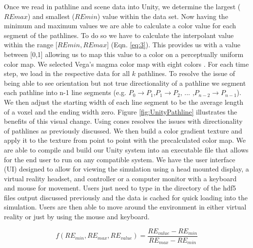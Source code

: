 Once we read in pathline and scene data into Unity, we determine the largest (\ensuremath{REmax}) and smallest (\ensuremath{REmin}) value within the data set. Now having the minimum and maximum values we are able to calculate a color value for each segment of the pathlines. To do so we have to calculate the interpolant value within the range [\ensuremath{REmin, REmax}] (Eqn. \ref{eq:3}). This provides us with a value between [0,1] allowing us to  map this value to a color on a perceptually uniform color map. We selected Vega’s magma color map with eight colors \cite{colorschemes}. For each time step, we load in the respective data for all \ensuremath{k} pathlines. To resolve the issue of being able to see orientation but not true directionality of a pathline we segment each pathline into n-1 line segments (e.g. \ensuremath{P_0\rightarrow P_1},\ensuremath{P_1 \rightarrow P_2}, ... ,\ensuremath{P_{n-2} \rightarrow P_{n-1}}).
We then adjust the starting width of each line segment to be the average length of a voxel and the ending width zero. Figure \ref{fig:UnityPathline} illustrates the benefits of this visual change. Using cones resolves the issues with directionality of pathlines as previously discussed. We then build a color gradient texture and apply it to the texture from point to point with the precalculated color map. We are able to compile and build our Unity system into an executable file that allows for the end user to run on any compatible system. We have the user interface (UI) designed to allow for viewing the simulation using a head mounted display, a virtual reality headset, and controller or a computer monitor with a keyboard and mouse for movement. Users just need to type in the directory of the hdf5 files output discussed previously and the data is cached for quick loading into the simulation. Users are then able to move around the environment in either virtual reality or just by using the mouse and keyboard. 


\begin{equation} \label{eq:3}
f(RE_{min},RE_{max},RE_{value}) = \frac{RE_{value}-RE_{min}}{RE_{max}-RE_{min}}
\end{equation} 

